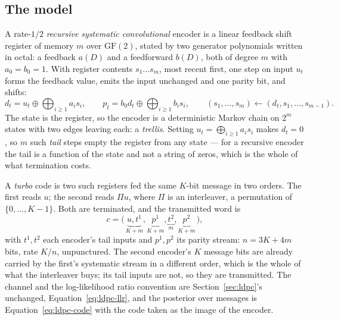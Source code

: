 \documentclass[11pt,a4paper]{article}
\begin{document}
\subsection{The model}
\label{sec:turbo:model}
A rate-$1/2$ \emph{recursive systematic convolutional} encoder is a linear
feedback shift register of memory $m$ over $\mathrm{GF}(2)$, stated by two
generator polynomials written in octal: a feedback $a(D)$ and a feedforward
$b(D)$, both of degree $m$ with $a_0 = b_0 = 1$. With register contents
$s_1 \dots s_m$, most recent first, one step on input $u_t$ forms the
feedback value, emits the input unchanged and one parity bit, and shifts:
\begin{equation}
  d_t = u_t \oplus \bigoplus_{i \ge 1} a_i s_i,
  \qquad
  p_t = b_0 d_t \oplus \bigoplus_{i \ge 1} b_i s_i,
  \qquad
  (s_1, \dots, s_m) \gets (d_t, s_1, \dots, s_{m-1}).
  \label{eq:rsc}
\end{equation}
The state is the register, so the encoder is a deterministic Markov chain on
$2^m$ states with two edges leaving each: a \emph{trellis}. Setting $u_t =
\bigoplus_{i \ge 1} a_i s_i$ makes $d_t = 0$, so $m$ such \emph{tail} steps
empty the register from any state --- for a recursive encoder the tail is a
function of the state and not a string of zeros, which is the whole of what
termination costs.

A \emph{turbo} code \citep{berrou1993} is two such registers fed the same
$K$-bit message in two orders. The first reads $u$; the second reads $\Pi
u$, where $\Pi$ is an interleaver, a permutation of $\{0, \dots, K-1\}$.
Both are terminated, and the transmitted word is
\begin{equation}
  c = \big(\, \underbrace{u, t^{1}}_{K + m},
              \underbrace{p^{1}}_{K + m},
              \underbrace{t^{2}}_{m},
              \underbrace{p^{2}}_{K + m} \,\big),
  \label{eq:turbo-word}
\end{equation}
with $t^{1}, t^{2}$ each encoder's tail inputs and $p^{1}, p^{2}$ its parity
stream: $n = 3K + 4m$ bits, rate $K/n$, unpunctured. The second encoder's $K$ message bits are
already carried by the first's systematic stream in a different order, which
is the whole of what the interleaver buys; its tail inputs are not, so they
are transmitted. The channel and the log-likelihood ratio convention are
Section~\ref{sec:ldpc}'s unchanged, Equation~\ref{eq:ldpc-llr}, and the
posterior over messages is Equation~\ref{eq:ldpc-code} with the code taken
as the image of the encoder.
\end{document}
